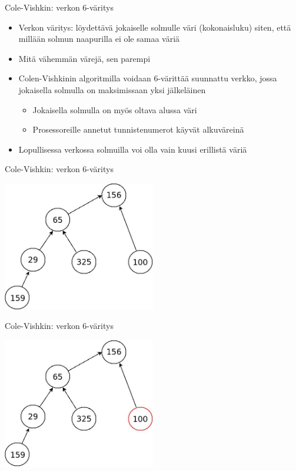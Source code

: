 \documentclass[a4paper, 12pt, finnish]{beamer}
\begin{document}
\begin{frame}{Cole-Vishkin: verkon 6-väritys}
    \begin{itemize}
        \item Verkon väritys: löydettävä jokaiselle solmulle väri (kokonaisluku) siten, että millään solmun naapurilla ei ole samaa väriä
        \item Mitä vähemmän värejä, sen parempi
        \item Colen-Vishkinin algoritmilla voidaan 6-värittää suunnattu verkko, jossa jokaisella solmulla on maksimissaan yksi jälkeläinen
        \begin{itemize}
            \item Jokaisella solmulla on myös oltava alussa väri
            \item Prosessoreille annetut tunnistenumerot käyvät alkuväreinä
        \end{itemize}
        \item Lopullisessa verkossa solmuilla voi olla vain kuusi erillistä väriä
    \end{itemize}
\end{frame}

\begin{frame}{Cole-Vishkin: verkon 6-väritys}
    \begin{center} 
        \includegraphics[width=0.5\textwidth]{Diagram4.jpeg} 
    \end{center} 
\end{frame}

\begin{frame}{Cole-Vishkin: verkon 6-väritys}
    \begin{center} 
        \includegraphics[width=0.5\textwidth]{Diagram5.jpeg} 
    \end{center} 
\end{frame}
\end{document}
